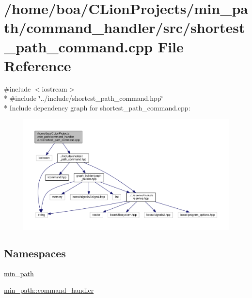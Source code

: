 \hypertarget{a00028}{}\section{/home/boa/\+C\+Lion\+Projects/min\+\_\+path/command\+\_\+handler/src/shortest\+\_\+path\+\_\+command.cpp File Reference}
\label{a00028}
{\ttfamily \#include $<$iostream$>$}\\*
{\ttfamily \#include \char`\"{}../include/shortest\+\_\+path\+\_\+command.\+hpp\char`\"{}}\\*
Include dependency graph for shortest\+\_\+path\+\_\+command.\+cpp\+:
\nopagebreak
\begin{figure}[H]
\begin{center}
\leavevmode
\includegraphics[width=350pt]{d3/d8b/a00059}
\end{center}
\end{figure}
\subsection*{Namespaces}
\begin{DoxyCompactItemize}
\item 
 \hyperlink{a00033}{min\+\_\+path}
\item 
 \hyperlink{a00035}{min\+\_\+path\+::command\+\_\+handler}
\end{DoxyCompactItemize}
